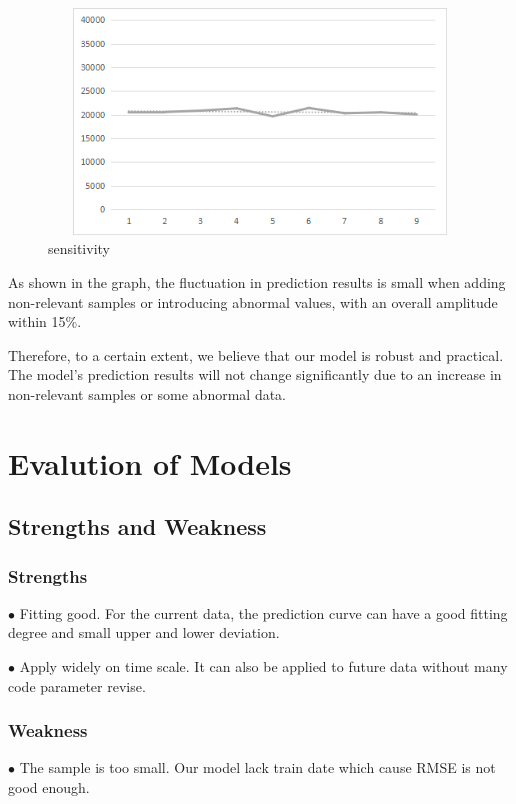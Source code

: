 \documentclass[12pt]{article}
\begin{document}
\begin{figure}[htbp]
	
	\centering
	\includegraphics[height=6cm, width=13cm]{sensitive.png}
	\caption{sensitivity}
	
\end{figure}

As shown in the graph, the fluctuation in prediction results is small when adding non-relevant samples or introducing abnormal values, with an overall amplitude within 15\%.

Therefore, to a certain extent, we believe that our model is robust and practical. The model's prediction results will not change significantly due to an increase in non-relevant samples or some abnormal data.

\section{Evalution of Models}
\subsection{Strengths and Weakness}
\subsubsection{Strengths}
$\bullet$ Fitting good. For the current data, the prediction curve can have a good fitting degree and small upper and lower deviation.

$\bullet$ Apply widely on time scale. It can also be applied to future data without many code parameter revise.

\subsubsection{Weakness}
$\bullet$ The sample is too small. Our model lack train date which cause RMSE is not good enough.
\end{document}
